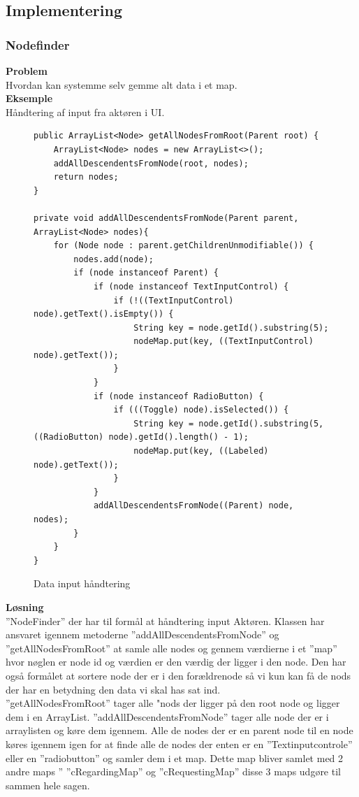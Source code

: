 \subsection{Implementering}
\subsubsection{Nodefinder}
\textbf{Problem}\\
Hvordan kan systemme selv gemme alt data i et map.\\
\textbf{Eksemple } \\
Håndtering af input fra aktøren i UI. 
\begin{figure} [hbt!]
\begin{lstlisting}
public ArrayList<Node> getAllNodesFromRoot(Parent root) {
	ArrayList<Node> nodes = new ArrayList<>();
	addAllDescendentsFromNode(root, nodes);
	return nodes;
}
    
private void addAllDescendentsFromNode(Parent parent, ArrayList<Node> nodes){
	for (Node node : parent.getChildrenUnmodifiable()) {
		nodes.add(node);
		if (node instanceof Parent) {
			if (node instanceof TextInputControl) {
				if (!((TextInputControl) node).getText().isEmpty()) {
					String key = node.getId().substring(5);
					nodeMap.put(key, ((TextInputControl) node).getText());
				}
			}
			if (node instanceof RadioButton) {
				if (((Toggle) node).isSelected()) {
					String key = node.getId().substring(5,((RadioButton) node).getId().length() - 1);
					nodeMap.put(key, ((Labeled) node).getText());
				}
			}
			addAllDescendentsFromNode((Parent) node, nodes);
		}
    }
}
\end{lstlisting}
\caption{Data input håndtering}
\label{kode:nodes}
\end{figure}
\textbf{Løsning }\\
”NodeFinder” der har til formål at håndtering input Aktøren. Klassen har ansvaret igennem metoderne ”addAllDescendentsFromNode” og ”getAllNodesFromRoot” at samle alle nodes og gennem værdierne i et ”map” hvor nøglen er node id og værdien er den værdig der ligger i den node. Den har også formålet at sortere node der er i den forældrenode så vi kun kan få de nods der har en betydning den data vi skal has sat ind. \\
”getAllNodesFromRoot” tager alle "nods der ligger på den root node og ligger dem i en ArrayList. ”addAllDescendentsFromNode” tager alle node der er i arraylisten og køre dem igennem. Alle de nodes der er en parent node til en node køres igennem igen for at finde alle de nodes der enten er en ”Textinputcontrole” eller en ”radiobutton” og samler dem i et map.  Dette map bliver samlet med 2 andre maps ” ”cRegardingMap” og ”cRequestingMap” disse 3 maps udgøre til sammen hele sagen.\\
